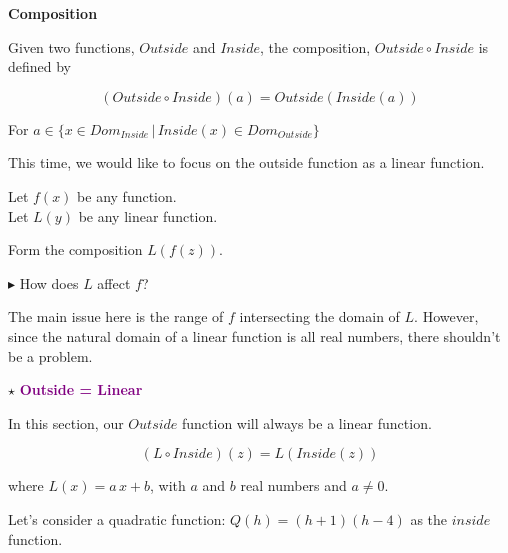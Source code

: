 \documentclass{ximera}
\begin{document}
\begin{idea} \textbf{\textcolor{blue!55!black}{Composition}}  


Given two functions, $Outside$ and $Inside$, the composition, $Outside \circ Inside$ is defined by

\[      (Outside \circ Inside)(a) = Outside(Inside(a))        \]

For $ a \in \{  x \in Dom_{Inside} \, | \,    Inside(x) \in Dom_{Outside}  \}$

\end{idea}


This time, we would like to focus on the outside function as a linear function.




Let $f(x)$ be any function. \\
Let $L(y)$ be any linear function. 


Form the composition $L(f(z))$. 

$\blacktriangleright$ How does $L$ affect $f$?




The main issue here is the range of $f$ intersecting the domain of $L$.  However, since the natural domain of a linear function is all real numbers, there shouldn't be a problem.






$\star$ \textbf{\textcolor{purple}{Outside = Linear}}


In this section, our $Outside$ function will always be a linear function.



\[      (L \circ Inside)(z) = L(Inside(z))        \]


where $L(x) = a \, x + b$, with $a$ and $b$ real numbers and $a \ne 0$.



Let's consider a quadratic function: $Q(h) = (h+1)(h-4)$ as the $inside$ function.
\end{document}
